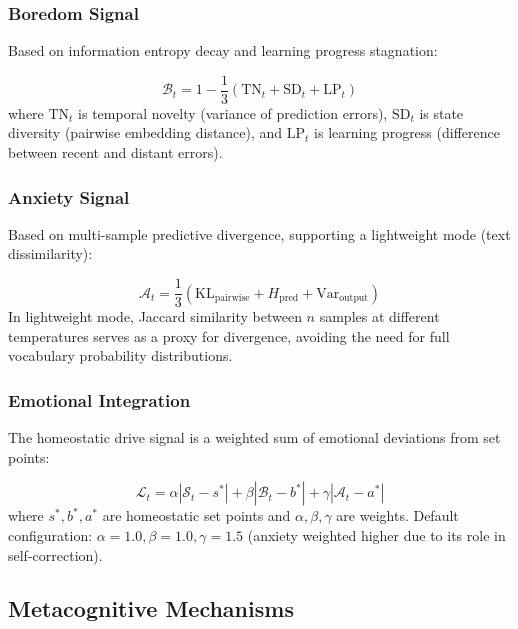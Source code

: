 \documentclass[pdflatex,sn-mathphys-num]{sn-jnl}
\newcommand{\surprise}{\mathcal{S}}
\newcommand{\boredom}{\mathcal{B}}
\newcommand{\anxiety}{\mathcal{A}}
\newcommand{\drive}{\mathcal{L}}
\theoremstyle{thmstyleone}%
\theoremstyle{thmstyletwo}%
\theoremstyle{thmstylethree}%
\begin{document}
\subsubsection{Boredom Signal}

Based on information entropy decay and learning progress stagnation:

\begin{equation}\label{eq:boredom}
\boredom_t = 1 - \frac{1}{3}\left(\text{TN}_t + \text{SD}_t + \text{LP}_t\right)
\end{equation}
where $\text{TN}_t$ is temporal novelty (variance of prediction errors), $\text{SD}_t$ is state diversity (pairwise embedding distance), and $\text{LP}_t$ is learning progress (difference between recent and distant errors).

\subsubsection{Anxiety Signal}

Based on multi-sample predictive divergence, supporting a lightweight mode (text dissimilarity):

\begin{equation}\label{eq:anxiety}
\anxiety_t = \frac{1}{3}\left(\text{KL}_{\text{pairwise}} + H_{\text{pred}} + \text{Var}_{\text{output}}\right)
\end{equation}
In lightweight mode, Jaccard similarity between $n$ samples at different temperatures serves as a proxy for divergence, avoiding the need for full vocabulary probability distributions.

\subsubsection{Emotional Integration}

The homeostatic drive signal is a weighted sum of emotional deviations from set points:

\begin{equation}\label{eq:drive}
\drive_t = \alpha|\surprise_t - s^*| + \beta|\boredom_t - b^*| + \gamma|\anxiety_t - a^*|
\end{equation}
where $s^*, b^*, a^*$ are homeostatic set points and $\alpha, \beta, \gamma$ are weights. Default configuration: $\alpha=1.0, \beta=1.0, \gamma=1.5$ (anxiety weighted higher due to its role in self-correction).

\subsection{Metacognitive Mechanisms}
\end{document}

